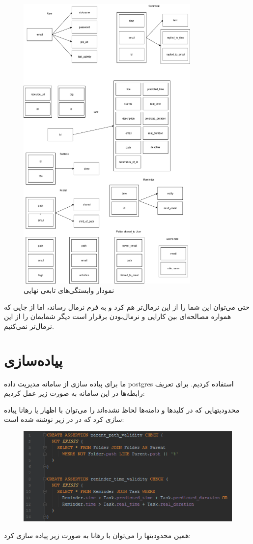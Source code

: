 \documentclass{article}
\begin{document}
\begin{figure}[H]
  \centering  
  \includegraphics[width = 0.8\textwidth]{Fucntional_Dependancy2.png}
  \caption{نمودار وابستگی‌های تابعی نهایی}
  \label{fig:fd2}
\end{figure}
حتی می‌توان این شما را از این نرمال‌تر هم کرد و به فرم نرمال  رساند، اما از جایی که همواره مصالحه‌ای بین کارایی و نرمال‌بودن برقرار است دیگر شمایمان را از این نرمال‌تر نمی‌کنیم.
\section*{پیاده‌سازی}
ما برای پیاده سازی از سامانه مدیریت داده postgres استفاده کردیم. برای تعریف رابطه‌ها در این سامانه به صورت زیر عمل کردیم: 

محدودیتهایی که در کلیدها و دامنه‌ها لحاظ نشده‌اند را می‌توان با اظهار یا رهانا پیاده سازی کرد که در در زیر نوشته شده است:

\begin{figure}[hbt!]
  \includegraphics[width =\textwidth]{assertions}
\end{figure}
 همین محدودیتها را می‌توان با رهانا به صورت زیر پیاده سازی کرد:
 
\end{document}
